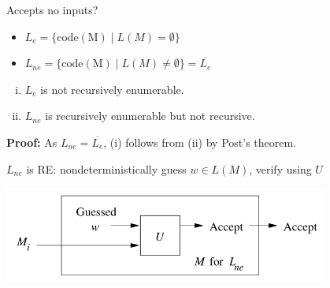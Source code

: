 \documentclass[handout]{beamer}
\begin{document}
\begin{frame}{Accepts no inputs?}

    \begin{itemize}
        \item $L_e=\{\mathrm{code(M)}\mid L(M)=\emptyset\}$
        \item $L_{ne}=\{\mathrm{code(M)}\mid L(M)\neq\emptyset\}=\overline{L_e}$
    \end{itemize}

    \begin{theorem}
        \begin{enumerate}[(i)]
            \item $L_{e}$ is not recursively enumerable.
            \item $L_{ne}$ is recursively enumerable but not recursive.
        \end{enumerate}
    \end{theorem}

    \textbf{Proof:} As $L_{ne}=\overline{L_{e}}$, \alert{(i) follows from (ii)} by Post's theorem.

    \medskip

    \alert{$L_{ne}$ is RE:} nondeterministically guess $w\in L(M)$, verify using $U$
 
    \begin{center}
        \includegraphics[width=0.8\textwidth]{files/Lne.PNG}
    \end{center}

\end{frame}
\end{document}

